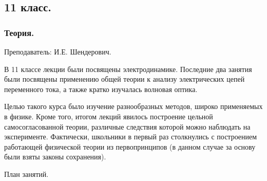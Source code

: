 \documentclass[12pt,a4paper,oneside]{scrartcl}
\begin{document}
\subsection{11 класс.}
\label{sec:daily_11}

\subsubsection{Теория.}
\label{sec:daily_11_th}

\textsf{Преподаватель: И.Е. Шендерович.}

В 11 классе лекции были посвящены электродинамике. Последние два
занятия были посвящены применению общей теории к анализу электрических
цепей переменного тока, а также кратко изучалась волновая оптика. 

Целью такого курса было изучение разнообразных методов, широко
применяемых в физике. Кроме того, итогом лекций явилось построение
цельной самосогласованной теории, различные следствия которой можно
наблюдать на эксперименте. Фактически, школьники в первый раз
столкнулись с построением работающей физической теории из
первопринципов (в данном случае за основу были взяты законы
сохранения). 

\begin{center}
  \textsf{План занятий.}
\end{center}
\end{document}
